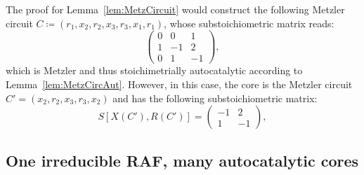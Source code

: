 \documentclass[pdflatex]{sn-jnl}
\theoremstyle{thmstyleone}%
\theoremstyle{examplesty}%
\theoremstyle{thmstylethree}%
\newcommand{\SM}{S}
\begin{document}
The proof for Lemma~\ref{lem:MetzCircuit} would construct the following
Metzler circuit $C\coloneqq (r_1,x_2,r_2,x_3,r_3,x_1,r_1)$, whose
substoichiometric matrix reads:
\begin{equation}
  \begin{pmatrix}
    0 & 0 & 1 \\
    1 & -1 & 2 \\
    0 & 1 & -1
  \end{pmatrix},
\end{equation}
which is Metzler and thus stoichimetrially autocatalytic according to
Lemma~\ref{lem:MetzCircAut}.  However, in this case, the core is the
Metzler circuit $C'=(x_2,r_2,x_3,r_3,x_2)$ and has the following
substoichiometric matrix:
\begin{equation}
  \SM[X(C'),R(C')]=
  \begin{pmatrix}		
    -1 & 2 \\
    1 & -1
  \end{pmatrix},
\end{equation}

\subsection{One irreducible RAF, many autocatalytic cores}\label{subsec:OneRAFManyCores}
\end{document}
